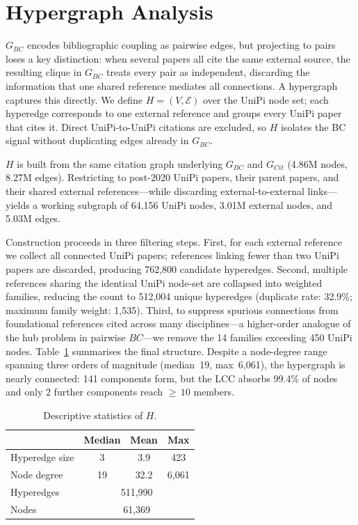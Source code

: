 \section{Hypergraph Analysis}\label{sec:HG}

$G_{BC}$ encodes bibliographic coupling as pairwise edges, but projecting to pairs loses a key distinction: when several papers all cite the same external source, the resulting clique in $G_{BC}$ treats every pair as independent, discarding the information that one shared reference mediates all connections. A hypergraph captures this directly. We define $H = (V, \mathcal{E})$ over the UniPi node set; each hyperedge corresponds to one external reference and groups every UniPi paper that cites it. Direct UniPi-to-UniPi citations are excluded, so $H$ isolates the BC signal without duplicating edges already in $G_{BC}$.

$H$ is built from the same citation graph underlying $G_{BC}$ and $G_{Cit}$
(4.86M nodes, 8.27M edges). Restricting to post-2020 UniPi papers, their parent papers, and their shared external references---while discarding external-to-external links---yields a working subgraph of 64,156 UniPi nodes, 3.01M external nodes, and 5.03M edges.

Construction proceeds in three filtering steps. First, for each external reference we collect all connected UniPi papers; references linking fewer than two UniPi papers are discarded, producing 762,800 candidate hyperedges.
Second, multiple references sharing the identical UniPi node-set are collapsed into weighted families, reducing the count to 512,004 unique hyperedges (duplicate rate: 32.9\%; maximum family weight: 1,535). Third, to suppress spurious connections from foundational references cited across many disciplines---a higher-order analogue of the hub problem in pairwise $BC$---we remove the 14 families exceeding 450 UniPi nodes.
Table~\ref{tab:hypergraph_stats} summarises the final structure. Despite a node-degree range spanning three orders of magnitude (median~19, max~6{,}061), the hypergraph is nearly connected: 141 components form, but the LCC absorbs 99.4\% of nodes and only 2 further components reach ${\geq}\,10$ members.

\begin{table}[h]
  \centering
  \footnotesize

  \begin{tabular}{lccc}
    \toprule
                   & \textbf{Median} & \textbf{Mean} & \textbf{Max} \\
    \midrule
    Hyperedge size & 3               & 3.9           & 423          \\
    Node degree    & 19              & 32.2          & 6{,}061      \\
    \midrule
    Hyperedges     & \multicolumn{3}{c}{511,990}                    \\
    Nodes          & \multicolumn{3}{c}{61,369}                     \\
    \bottomrule
  \end{tabular}
    \caption{Descriptive statistics of $H$.}
  \label{tab:hypergraph_stats}
\end{table}

